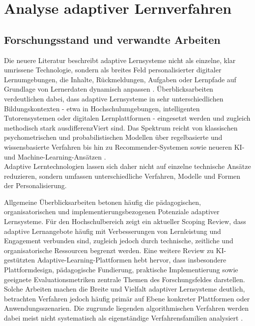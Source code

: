 
\chapter{Analyse adaptiver
Lernverfahren}\label{analyse-adaptiver-lernverfahren}

\section{Forschungsstand und verwandte
Arbeiten}\label{forschungsstand-und-verwandte-arbeiten}

Die neuere Literatur beschreibt adaptive Lernsysteme nicht als einzelne,
klar umrissene Technologie, sondern als breites Feld personalisierter
digitaler Lernumgebungen, die Inhalte, Rückmeldungen, Aufgaben oder
Lernpfade auf Grundlage von Lernerdaten dynamisch anpassen
\citep{duPlooy2024, Wang2025, Martin2020}. Überblicksarbeiten
verdeutlichen dabei, dass adaptive Lernsysteme in sehr unterschiedlichen
Bildungskontexten - etwa in Hochschulumgebungen, intelligenten
Tutorensystemen oder digitalen Lernplattformen - eingesetzt werden und
zugleich methodisch stark ausdifferenzViert sind. Das Spektrum reicht von
klassischen psychometrischen und probabilistischen Modellen über
regelbasierte und wissensbasierte Verfahren bis hin zu
Recommender-Systemen sowie neueren KI- und Machine-Learning-Ansätzen
\citep{Wang2025, Hariyanto2025, daSilva2023, Liu2024}.\\
Adaptive Lerntechnologien lassen sich daher nicht auf einzelne
technische Ansätze reduzieren, sondern umfassen unterschiedliche
Verfahren, Modelle und Formen der Personalisierung.

Allgemeine Überblicksarbeiten betonen häufig die pädagogischen,
organisatorischen und implementierungsbezogenen Potenziale adaptiver
Lernsysteme. Für den Hochschulbereich zeigt ein aktueller Scoping
Review, dass adaptive Lernangebote häufig mit Verbesserungen von
Lernleistung und Engagement verbunden sind, zugleich jedoch durch
technische, zeitliche und organisatorische Ressourcen begrenzt werden.
Eine weitere Review zu KI-gestützten Adaptive-Learning-Plattformen hebt
hervor, dass insbesondere Plattformdesign, pädagogische Fundierung,
praktische Implementierung sowie geeignete Evaluationsmetriken zentrale
Themen des Forschungsfeldes darstellen. Solche Arbeiten machen die
Breite und Vielfalt adaptiver Lernsysteme deutlich, betrachten Verfahren
jedoch häufig primär auf Ebene konkreter Plattformen oder
Anwendungsszenarien. Die zugrunde liegenden algorithmischen Verfahren
werden dabei meist nicht systematisch als eigenständige
Verfahrensfamilien analysiert \citep{duPlooy2024, Tan2025}.

